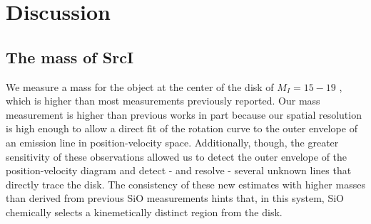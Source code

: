 \documentclass[twocolumn]{aastex61}
\newcommand{\sourcei}{SrcI}
\begin{document}


% 
% 


\section{Discussion}
\label{sec:discussion}
\subsection{The mass of \sourcei}
We measure a mass for the object at the center of the disk of $M_I=15-19$
\msun, which is higher than most measurements previously reported.  Our mass
measurement is higher than previous works in part because our spatial
resolution is high enough to allow a direct fit of the rotation curve to the
outer envelope of an emission line in position-velocity space.
Additionally, though, the greater sensitivity of these observations allowed
us to detect the outer envelope of the \water position-velocity diagram
and detect - and resolve - several unknown lines that directly trace the disk.
The consistency of these new estimates with higher masses than derived from
previous SiO measurements hints that, in this system, SiO chemically selects a
kinemetically distinct region from the disk.
\end{document}
